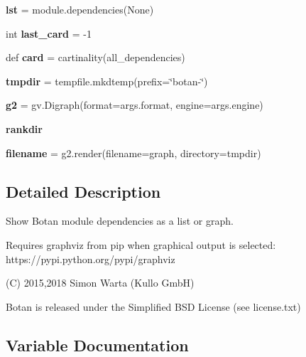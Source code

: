\begin{DoxyCompactItemize}
{\bfseries lst} = module.\+dependencies(None)
\item 
\mbox{\label{namespaceshow__dependencies_a0d3570b84dee2c17f48ad0d03d58f94f}} 
int {\bfseries last\+\_\+card} = -\/1
\item 
\mbox{\label{namespaceshow__dependencies_a9700b8aabf87b06b5ef31c1ee3f721d6}} 
def {\bfseries card} = cartinality(all\+\_\+dependencies)
\item 
\mbox{\label{namespaceshow__dependencies_aa24e172b1a39d57c55f4082763f6a515}} 
{\bfseries tmpdir} = tempfile.\+mkdtemp(prefix=\char`\"{}botan-\/\char`\"{})
\item 
\mbox{\label{namespaceshow__dependencies_a6a3acbaff1b1b35729428bd179f0eb0b}} 
{\bfseries g2} = gv.\+Digraph(format=args.\+format, engine=args.\+engine)
\item 
\mbox{\label{namespaceshow__dependencies_ae415a5ae8f8ae94fa7afd2d77436e91c}} 
{\bfseries rankdir}
\item 
\mbox{\label{namespaceshow__dependencies_a48e42fc6c144e9378a533abf8e24a1c5}} 
{\bfseries filename} = g2.\+render(filename=\textquotesingle{}graph\textquotesingle{}, directory=tmpdir)
\end{DoxyCompactItemize}


\subsection{Detailed Description}
\begin{DoxyVerb}Show Botan module dependencies as a list or graph.

Requires graphviz from pip when graphical output is selected:
https://pypi.python.org/pypi/graphviz

(C) 2015,2018 Simon Warta (Kullo GmbH)

Botan is released under the Simplified BSD License (see license.txt)
\end{DoxyVerb}
 

\subsection{Variable Documentation}
\mbox{\label{namespaceshow__dependencies_a9736252e34117caac9d047cc9ae8c24b}} 
